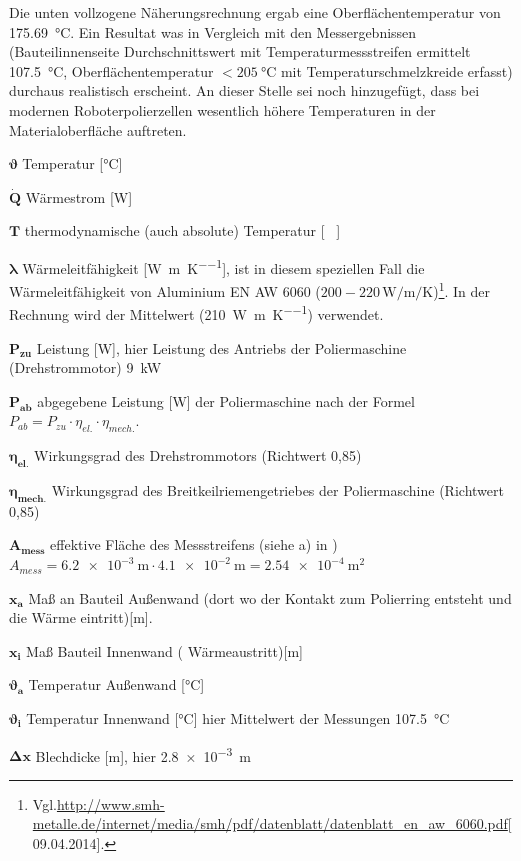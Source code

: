\documentclass[12pt,a4paper,parskip,twoside,BCOR5mm,headsepline]{scrartcl}
\begin{document}
Die unten vollzogene Näherungsrechnung ergab eine Oberflächentemperatur von \SI{175.69}{\degreeCelsius}. Ein Resultat was in Vergleich mit den Messergebnissen (Bauteilinnenseite Durchschnittswert mit Temperaturmessstreifen ermittelt \SI{107.5}{\degreeCelsius}, Oberflächentemperatur $< \SI{205}{\degreeCelsius}$ mit Temperaturschmelzkreide erfasst) durchaus realistisch erscheint.
An dieser Stelle sei noch hinzugefügt, dass  bei modernen Roboterpolierzellen wesentlich höhere Temperaturen in der Materialoberfläche auftreten.



\newpage
\begin{description*}
\item[ $\boldsymbol{\vartheta }$] Temperatur  [\si{\degreeCelsius}]
\item[$ \boldsymbol{\dot{Q}} $ ] Wärmestrom [\si{\watt}]
\item[$\boldsymbol{ \si{T}}$] thermodynamische (auch absolute) Temperatur [\si{\kelvin
}]
\item[$\boldsymbol{\lambda} $] Wärmeleitfähigkeit [\si{\watt\per\metre\per\kelvin}], ist in diesem speziellen Fall die Wärmeleitfähigkeit von Aluminium EN AW 6060 ($200-220 \, \si{\watt\per\meter\per\kelvin}$)\footnote{Vgl.\url{http://www.smh-metalle.de/internet/media/smh/pdf/datenblatt/datenblatt_en_aw_6060.pdf}[09.04.2014].}. In der Rechnung wird der Mittelwert (\SI{210}{\watt\per\meter\per\kelvin}) verwendet.
\item[$\boldsymbol{ P_{zu}} $] Leistung [\si{\watt}], hier Leistung des Antriebs der Poliermaschine (Drehstrommotor)  \SI{9}{\kilo\watt}
\item[$\boldsymbol{P_{ab}} $]  abgegebene Leistung [\si{\watt}] der Poliermaschine nach der Formel $ P_{ab} = P_{zu} \cdot \eta_{el.} \cdot \eta_{mech.}$. \autocite[R2]{g}
\item[$\boldsymbol{\eta_{el.} }$] Wirkungsgrad des Drehstrommotors (Richtwert 0,85) \autocite[40]{tm}
\item[$\boldsymbol{\eta_{mech.}} $]Wirkungsgrad des Breitkeilriemengetriebes der Poliermaschine (Richtwert 0,85) \autocite[40]{tm}
\item[$\boldsymbol{A_{mess}} $] effektive Fläche des Messstreifens (siehe  a) in ) $ A_{mess} = \SI{6.2e-3}{\meter} \cdot \SI{4.1e-2}{\meter} = \SI{2.54e-4}{\meter\squared}$
\item[$\boldsymbol{x_a }$]  Maß an Bauteil Außenwand (dort wo der Kontakt zum Polierring entsteht und die Wärme eintritt)[\si{\meter}]. 
\item[$\boldsymbol{x_i}$] Maß Bauteil Innenwand ( Wärmeaustritt)[\si{\meter}]
\item[$\boldsymbol{\vartheta_a}$] Temperatur Außenwand [\si{\degreeCelsius}] 
\item[$\boldsymbol{\vartheta_i}$] Temperatur Innenwand [\si{\degreeCelsius}] hier Mittelwert der Messungen \SI{107.5}{\degreeCelsius} 
\item[$\boldsymbol{ \Delta x }$] Blechdicke [\si{\meter}], hier \SI{2.8e-3}{\meter}


\end{description*}
\end{document}
